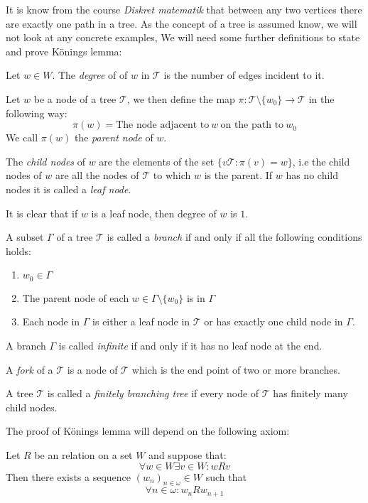 \documentclass[../main.tex]{subfiles}
\begin{document}
It is know from the course \textit{Diskret matematik} that between any two
vertices there are exactly one path in a tree. 
As the concept of a tree is assumed know, we will not look at any concrete
examples,
We will need
some further definitions to state and prove Könings lemma:
\begin{defi}
	Let $w\in W$. The \textit{degree} of of $w$ in $\mathcal{T}$ is the
	number of edges incident to it.
\end{defi}
\begin{defi}
	Let $w$ be a node of a tree $\mathcal{T}$, we then define the map
	$\pi:\mathcal{T}\setminus\{w_0\}\rightarrow\mathcal{T}$ in the
	following way:
	\[\pi(w)=\text{The node adjacent to}\ w\ \text{on the path to}\ w_0\]
	We call $\pi(w)$ the \textit{parent node} of $w$. 

	The \textit{child nodes} of $w$ are the elements of the set
	$\{v\mathcal{T}:\pi(v)=w\}$, i.e the child nodes of $w$ are all the
	nodes of $\mathcal{T}$ to which $w$ is the parent. If $w$ has no child
	nodes it is called a \textit{leaf node}.
\end{defi}
It is clear that if $w$ is a leaf node, then degree of $w$ is $1$.
\begin{defi}
	A subset $\Gamma$ of a tree $\mathcal{T}$ is called a
	\textit{branch} if and only if all the following conditions holds:
	\begin{enumerate}
		\item $w_0\in\Gamma$
		\item The parent node of each $w\in\Gamma\setminus\{w_0\}$ is
			in $\Gamma$
		\item Each node in $\Gamma$ is either a leaf node in
			$\mathcal{T}$ or has exactly one child node in
			$\Gamma$.
	\end{enumerate}
	A branch $\Gamma$ is called \textit{infinite} if and only if it has no
	leaf node at the end.
\end{defi}
\begin{defi}
	A \textit{fork} of a $\mathcal{T}$ is a node of $\mathcal{T}$ which is the end
	point of two or more branches.
\end{defi}
\begin{defi}
	A tree $\mathcal{T}$ is called a \textit{finitely branching tree} if
	every node of $\mathcal{T}$ has finitely many child nodes.
\end{defi}

The proof of Könings lemma will depend on the following axiom:
\begin{axiom}
	Let $R$ be an relation on a set $W$ and suppose that:
	\[\forall w\in W\exists v\in W: wRv\]
	Then there exists a sequence $(w_n)_{n\in\omega}\in W$ such that
	\[\forall n\in\omega: w_nRw_{n+1}\]
\end{axiom}
\end{document}
